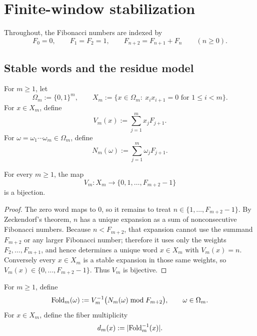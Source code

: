 \section{Finite-window stabilization}\label{sec:preliminaries}

Throughout, the Fibonacci numbers are indexed by
\[
  F_0=0,
  \qquad
  F_1=F_2=1,
  \qquad
  F_{n+2}=F_{n+1}+F_n
  \qquad (n\ge 0).
\]

\subsection{Stable words and the residue model}

\begin{definition}
\label{def:stable-words}
For \(m\ge 1\), let
\[
  \Omega_m:=\{0,1\}^m,
  \qquad
  X_m:=\{x\in\Omega_m:\ x_ix_{i+1}=0\text{ for }1\le i<m\}.
\]
For \(x\in X_m\), define
\[
  V_m(x):=\sum_{j=1}^m x_jF_{j+1}.
\]
For \(\omega=\omega_1\cdots \omega_m\in\Omega_m\), define
\[
  N_m(\omega):=\sum_{j=1}^m \omega_jF_{j+1}.
\]
\end{definition}

\begin{proposition}
\label{prop:Vm-bijection}
For every \(m\ge 1\), the map
\[
  V_m\colon X_m\longrightarrow \{0,1,\dots,F_{m+2}-1\}
\]
is a bijection.
\end{proposition}

\begin{proof}
The zero word maps to \(0\), so it remains to treat
\(n\in\{1,\dots,F_{m+2}-1\}\).  By Zeckendorf's theorem, \(n\) has a unique
expansion as a sum of nonconsecutive Fibonacci numbers.  Because
\(n<F_{m+2}\), that expansion cannot use the summand \(F_{m+2}\) or any larger
Fibonacci number; therefore it uses only the weights \(F_2,\dots,F_{m+1}\),
and hence determines a unique word \(x\in X_m\) with \(V_m(x)=n\).
Conversely every \(x\in X_m\) is a stable expansion in those same weights, so
\(V_m(x)\in\{0,\dots,F_{m+2}-1\}\).  Thus \(V_m\) is bijective.
\end{proof}

\begin{definition}
\label{def:fold-map}
For \(m\ge 1\), define
\[
  \mathrm{Fold}_m(\omega):=
  V_m^{-1}\bigl(N_m(\omega)\bmod F_{m+2}\bigr),
  \qquad \omega\in\Omega_m.
\]
For \(x\in X_m\), define the fiber multiplicity
\[
  d_m(x):=\lvert \mathrm{Fold}_m^{-1}(x) \rvert.
\]
\end{definition}

